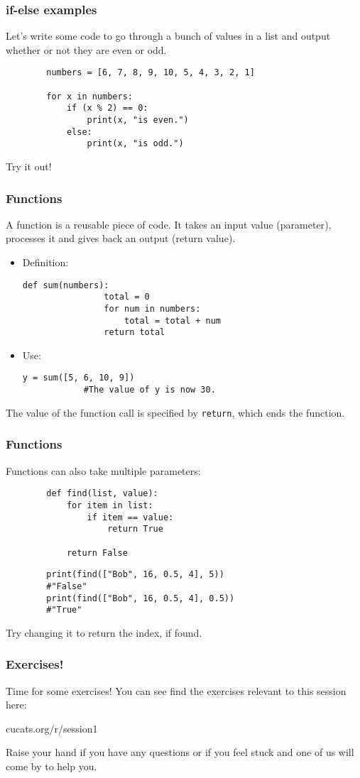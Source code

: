 \documentclass[notes]{beamer}
\begin{document}
	\begin{frame}[fragile]
		\frametitle{if-else examples}
		
		Let's write some code to go through a bunch of values in a list and output whether or not they are even or odd.
		
		\pause
		\begin{lstlisting}
		numbers = [6, 7, 8, 9, 10, 5, 4, 3, 2, 1]
		
		for x in numbers:
		    if (x % 2) == 0:
		        print(x, "is even.")
		    else:
		        print(x, "is odd.")
		\end{lstlisting}
		\pause
		Try it out!
	\end{frame}
	
	\begin{frame}[fragile]
		\frametitle{Functions}
		
		A function is a reusable piece of code. It takes an input value (\colorbox{jargonbg}{parameter}), processes it and gives back an output (\colorbox{jargonbg}{return value}). \pause
		
		\begin{itemize}
			\item Definition:
			\begin{lstlisting}[xleftmargin=\dimexpr-\leftmargini]
			def sum(numbers):
			    total = 0
			    for num in numbers:
			        total = total + num
			    return total
			\end{lstlisting}
			\pause
			
			\item Use:
			\begin{lstlisting}[xleftmargin=\dimexpr-\leftmargini]
			y = sum([5, 6, 10, 9])
			#The value of y is now 30.
			\end{lstlisting}
		\end{itemize}
		
		The value of the function call is specified by \lstinline|return|, which ends the function.
	\end{frame}
	
	\begin{frame}[fragile]
		\frametitle{Functions}
		Functions can also take multiple parameters:
		\begin{lstlisting}
		def find(list, value):
		    for item in list:
		        if item == value:
		            return True
		
		    return False
		\end{lstlisting}
		\begin{lstlisting}
		print(find(["Bob", 16, 0.5, 4], 5))
		#"False"
		print(find(["Bob", 16, 0.5, 4], 0.5))
		#"True"
		\end{lstlisting}
		
		\pause

		Try changing it to return the index, if found.
	\end{frame}

	\begin{frame}[fragile]
		\frametitle{Exercises!}
		Time for some exercises! You can see find the exercises relevant to this session here:
		\vfill
		\centerline{\LARGE cucats.org/r/session1}
		\vfill
		Raise your hand if you have any questions or if you feel stuck and one of us will come by to help you.
	\end{frame}
\end{document}
